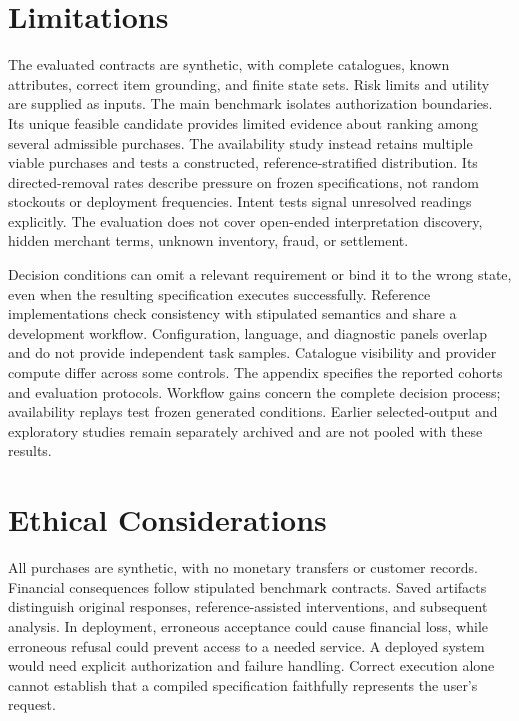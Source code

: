 \documentclass[11pt]{article}
\renewcommand{\dbltopfraction}{0.85}
\begin{document}
\section*{Limitations}
The evaluated contracts are synthetic, with complete catalogues, known attributes, correct item grounding, and finite state sets. Risk limits and utility are supplied as inputs. The main benchmark isolates authorization boundaries. Its unique feasible candidate provides limited evidence about ranking among several admissible purchases. The availability study instead retains multiple viable purchases and tests a constructed, reference-stratified distribution. Its directed-removal rates describe pressure on frozen specifications, not random stockouts or deployment frequencies. Intent tests signal unresolved readings explicitly. The evaluation does not cover open-ended interpretation discovery, hidden merchant terms, unknown inventory, fraud, or settlement.

Decision conditions can omit a relevant requirement or bind it to the wrong state, even when the resulting specification executes successfully. Reference implementations check consistency with stipulated semantics and share a development workflow. Configuration, language, and diagnostic panels overlap and do not provide independent task samples. Catalogue visibility and provider compute differ across some controls. The appendix specifies the reported cohorts and evaluation protocols. Workflow gains concern the complete decision process; availability replays test frozen generated conditions. Earlier selected-output and exploratory studies remain separately archived and are not pooled with these results.

\section*{Ethical Considerations}
All purchases are synthetic, with no monetary transfers or customer records. Financial consequences follow stipulated benchmark contracts. Saved artifacts distinguish original responses, reference-assisted interventions, and subsequent analysis. In deployment, erroneous acceptance could cause financial loss, while erroneous refusal could prevent access to a needed service. A deployed system would need explicit authorization and failure handling. Correct execution alone cannot establish that a compiled specification faithfully represents the user's request.


\clearpage
\appendix
\setcounter{dbltopnumber}{2}
\renewcommand{\dbltopfraction}{0.7}
\makeatletter
\setlength{\@dblfptop}{0pt}
\setlength{\@dblfpsep}{18pt}
\setlength{\@dblfpbot}{0pt plus 1fil}
\makeatother

\end{document}
